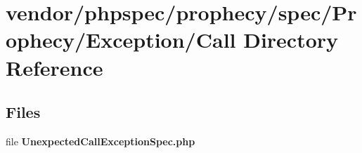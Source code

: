 \section{vendor/phpspec/prophecy/spec/\+Prophecy/\+Exception/\+Call Directory Reference}
\label{dir_596c04ab82bd4f68a768c21c0ed06118}
\subsection*{Files}
\begin{DoxyCompactItemize}
\item 
file {\bf Unexpected\+Call\+Exception\+Spec.\+php}
\end{DoxyCompactItemize}
